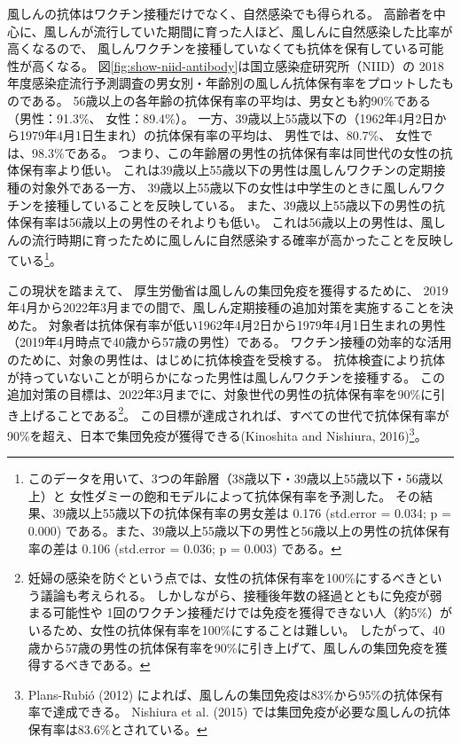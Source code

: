 \documentclass[
  11pt,
  a4paper,
]{article}
\begin{document}
風しんの抗体はワクチン接種だけでなく、自然感染でも得られる。
高齢者を中心に、風しんが流行していた期間に育った人ほど、風しんに自然感染した比率が高くなるので、
風しんワクチンを接種していなくても抗体を保有している可能性が高くなる。
図\ref{fig:show-niid-antibody}は国立感染症研究所（NIID）の
2018年度感染症流行予測調査の男女別・年齢別の風しん抗体保有率をプロットしたものである。
56歳以上の各年齢の抗体保有率の平均は、男女とも約90\%である
（男性：91.3\%、
女性：89.4\%）。
一方、39歳以上55歳以下の（1962年4月2日から1979年4月1日生まれ）の抗体保有率の平均は、
男性では、80.7\%、
女性では、98.3\%である。
つまり、この年齢層の男性の抗体保有率は同世代の女性の抗体保有率より低い。
これは39歳以上55歳以下の男性は風しんワクチンの定期接種の対象外である一方、
39歳以上55歳以下の女性は中学生のときに風しんワクチンを接種していることを反映している。
また、39歳以上55歳以下の男性の抗体保有率は56歳以上の男性のそれよりも低い。
これは56歳以上の男性は、風しんの流行時期に育ったために風しんに自然感染する確率が高かったことを反映している\footnote{このデータを用いて、3つの年齢層（38歳以下・39歳以上55歳以下・56歳以上）と
  女性ダミーの飽和モデルによって抗体保有率を予測した。
  その結果、39歳以上55歳以下の抗体保有率の男女差は
  0.176 (std.error = 0.034; p = 0.000)
  である。また、39歳以上55歳以下の男性と56歳以上の男性の抗体保有率の差は
  0.106 (std.error = 0.036; p = 0.003)
  である。}。

この現状を踏まえて、
厚生労働省は風しんの集団免疫を獲得するために、
2019年4月から2022年3月までの間で、風しん定期接種の追加対策を実施することを決めた。
対象者は抗体保有率が低い1962年4月2日から1979年4月1日生まれの男性（2019年4月時点で40歳から57歳の男性）である。
ワクチン接種の効率的な活用のために、対象の男性は、はじめに抗体検査を受検する。
抗体検査により抗体が持っていないことが明らかになった男性は風しんワクチンを接種する。
この追加対策の目標は、2022年3月までに、対象世代の男性の抗体保有率を90\%に引き上げることである\footnote{妊婦の感染を防ぐという点では、女性の抗体保有率を100\%にするべきという議論も考えられる。
  しかしながら、接種後年数の経過とともに免疫が弱まる可能性や
  1回のワクチン接種だけでは免疫を獲得できない人（約5\%）がいるため、女性の抗体保有率を100\%にすることは難しい。
  したがって、40歳から57歳の男性の抗体保有率を90\%に引き上げて、風しんの集団免疫を獲得するべきである。}。
この目標が達成されれば、すべての世代で抗体保有率が90\%を超え、日本で集団免疫が獲得できる(Kinoshita and Nishiura, 2016)\footnote{Plans-Rubió (2012) によれば、風しんの集団免疫は83\%から95\%の抗体保有率で達成できる。
  Nishiura et al. (2015) では集団免疫が必要な風しんの抗体保有率は83.6\%とされている。}。
\end{document}
